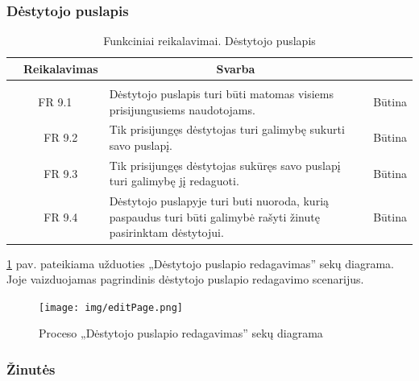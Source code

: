 \documentclass{VUMIFPSkursinis}
\begin{document}
\subsubsection{Dėstytojo puslapis}

\begin{table}[H]
	\caption{Funkciniai reikalavimai. Dėstytojo puslapis}
	\begin{tabular}{|p{1cm}|p{1cm}|p{}|p{}|}
		\hline 
		\rowcolor{gray!50}
		\multicolumn{2}{|c|}{{\bfseries Kodas}}&
		\multicolumn{1}{c|}{{\bfseries Reikalavimas}}&
		\multicolumn{1}{c|}{{\bfseries Svarba}}\\
		\hline
		\rowcolor{lightgray}
		\multicolumn{4}{|c|}{Dėstytojo puslapis}\\		
		
		\hline
		\multicolumn{2}{|c|}{FR 9.1}&
		{Dėstytojo puslapis turi būti matomas visiems prisijungusiems naudotojams.
		}&		
		\multicolumn{1}{c|}{Būtina}\\
		\hline
		\multicolumn{1}{|c}{}&
		\multicolumn{1}{c|}{FR 9.2}&
		{Tik prisijungęs dėstytojas turi galimybę sukurti savo puslapį.
		}&		
		\multicolumn{1}{c|}{Būtina}\\
		\hline
		\multicolumn{1}{|c}{}&
		\multicolumn{1}{c|}{FR 9.3}&
		{Tik prisijungęs dėstytojas sukūręs savo puslapį turi galimybę jį redaguoti.
		}&
		\multicolumn{1}{c|}{Būtina}\\	
		\hline		
		\multicolumn{1}{|c}{}&
		\multicolumn{1}{c|}{FR 9.4}&
		{Dėstytojo puslapyje turi buti nuoroda, kurią paspaudus turi būti galimybė rašyti žinutę pasirinktam dėstytojui.
		}&
		\multicolumn{1}{c|}{Būtina}\\									
		\hline
	\end{tabular}		
\end{table}

\ref{fig:editpage} pav. pateikiama užduoties „Dėstytojo puslapio redagavimas” sekų diagrama. Joje vaizduojamas pagrindinis dėstytojo puslapio redagavimo scenarijus.
\begin{figure}[H]
	\centering
	\texttt{[image: img/editPage.png]}
	\caption{Proceso „Dėstytojo puslapio redagavimas” sekų diagrama}
	\label{fig:editpage}
\end{figure}

\subsubsection{Žinutės}
\end{document}
